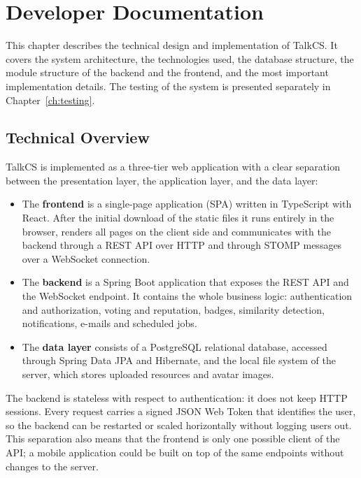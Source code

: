 \chapter{Developer Documentation}
\label{ch:devdoc}

This chapter describes the technical design and implementation of TalkCS. It covers
the system architecture, the technologies used, the database structure, the module
structure of the backend and the frontend, and the most important implementation
details. The testing of the system is presented separately in
Chapter~\ref{ch:testing}.

\section{Technical Overview}

TalkCS is implemented as a three-tier web application with a clear separation between
the presentation layer, the application layer, and the data layer:

\begin{itemize}
  \item The \textbf{frontend} is a single-page application (SPA) written in TypeScript
    with React. After the initial download of the static files it runs entirely in the
    browser, renders all pages on the client side and communicates with the backend
    through a REST API over HTTP and through STOMP messages over a WebSocket connection.
  \item The \textbf{backend} is a Spring Boot application that exposes the REST API and
    the WebSocket endpoint. It contains the whole business logic: authentication and
    authorization, voting and reputation, badges, similarity detection, notifications,
    e-mails and scheduled jobs.
  \item The \textbf{data layer} consists of a PostgreSQL relational database, accessed
    through Spring Data JPA and Hibernate, and the local file system of the server,
    which stores uploaded resources and avatar images.
\end{itemize}

The backend is stateless with respect to authentication: it does not keep HTTP
sessions. Every request carries a signed JSON Web Token that identifies the user, so
the backend can be restarted or scaled horizontally without logging users out. This
separation also means that the frontend is only one possible client of the API; a
mobile application could be built on top of the same endpoints without changes to the
server.

